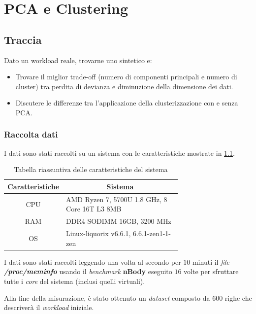 \chapter{PCA e Clustering}

\section{Traccia}
Dato un workload reale, trovarne uno sintetico e:

\begin{itemize}
    \item Trovare il miglior trade-off (numero di componenti principali e numero di cluster) tra perdita di devianza e diminuzione della dimensione dei dati.
    \item Discutere le differenze tra l'applicazione della clusterizzazione con e senza PCA.
\end{itemize}

\subsection{Raccolta dati}
I dati sono stati raccolti su un sistema con le caratteristiche mostrate in \cref{tab:pca_specs}.

\begin{table}[H]
\centering
    \begin{tabular}{|c|p{0.7\linewidth} |}
    \hline
    \multicolumn{1}{|c|}{\textbf{Caratteristiche}} &
    \multicolumn{1}{c|}{\textbf{Sistema}}  \tabularnewline \hline


CPU & AMD Ryzen 7, 5700U 1.8 GHz, 8 Core 16T L3 8MB \tabularnewline \hline

RAM & DDR4 SODIMM 16GB, 3200 MHz \tabularnewline \hline

OS & Linux-liquorix v6.6.1, 6.6.1-zen1-1-zen \tabularnewline \hline
\end{tabular}
\caption{Tabella riassuntiva delle caratteristiche del sistema}
\label{tab:pca_specs}
\end{table}

I dati sono stati raccolti leggendo una volta al secondo per $10$ minuti il \textit{file} \textbf{\textit{/proc/meminfo}} usando il \textit{benchmark} \textbf{nBody} eseguito $16$ volte per sfruttare tutte i \textit{core} del sistema (inclusi quelli virtuali).

Alla fine della misurazione, è stato ottenuto un \textit{dataset} composto da $600$ righe che descriverà il \textit{workload} iniziale.

